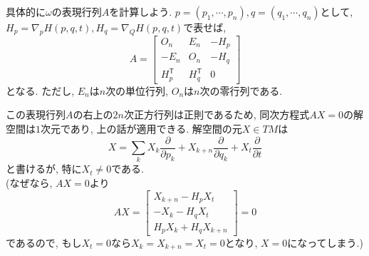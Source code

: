 \documentclass[a4paper]{ujarticle}
\numberwithin{equation}{section}
\theoremstyle{definition}
\begin{document}
    具体的に$\omega$の表現行列$A$を計算しよう. $p = (p_1, \cdots, p_n), q =(q_1, \cdots, q_n)$として,
    $H_p = \nabla_{p} H(p, q, t), H_q = \nabla_{Q} H(p, q, t)$で表せば, 
    \[
        A = 
        \begin{bmatrix}
            O_n & E_n & - H_p \\
            - E_n & O_n & - H_q \\
            H_p^{\mathsf{T}} & H_q^{\mathsf{T}} & 0
        \end{bmatrix}
    \]
    となる. ただし, $E_n$は$n$次の単位行列, $O_n$は$n$次の零行列である.

    この表現行列$A$の右上の$2n$次正方行列は正則であるため, 
    同次方程式$AX = 0$の解空間は$1$次元であり, 上の話が適用できる.
    解空間の元$X \in TM$は
    \[
        X = \sum_{k} X_k \frac{\partial}{\partial p_k} + X_{k+n} \frac{\partial}{\partial q_k} + X_t \frac{\partial}{\partial t}
    \] 
    と書けるが, 特に$X_t \neq 0$である.\\
    (なぜなら, $AX = 0$より
    \[  AX = 
        \begin{bmatrix}
            X_{k+n}  -H_p X_t \\
            -X_k -H_q X_t\\
            H_p X_k + H_q X_{k+n}
        \end{bmatrix} = 0
    \]
    であるので, もし$X_t = 0$なら$X_k = X_{k+n} = X_t = 0$となり, $X = 0$になってしまう.)
    
\end{document}
